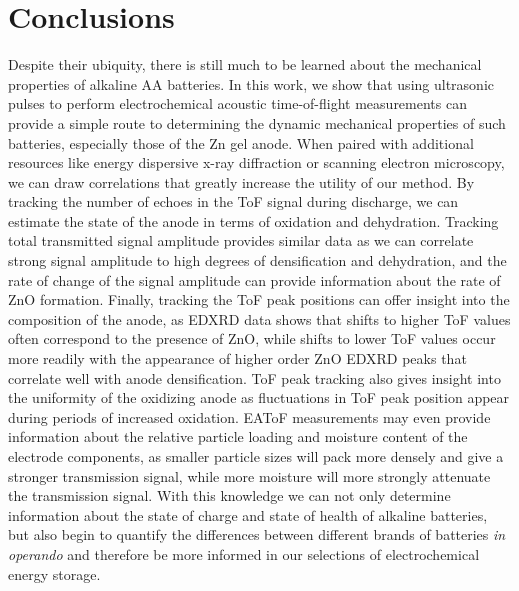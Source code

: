 \section{Conclusions}
\label{sec:alkbw:conclusion}

Despite their ubiquity, there is still much to be learned about the mechanical properties of alkaline AA batteries. In this work, we show that using ultrasonic pulses to perform electrochemical acoustic time-of-flight measurements can provide a simple route to determining the dynamic mechanical properties of such batteries, especially those of the Zn gel anode. When paired with additional resources like energy dispersive x-ray diffraction or scanning electron microscopy, we can draw correlations that greatly increase the utility of our method. By tracking the number of echoes in the ToF signal during discharge, we can estimate the state of the anode in terms of oxidation and dehydration. Tracking total transmitted signal amplitude provides similar data as we can correlate strong signal amplitude to high degrees of densification and dehydration, and the rate of change of the signal amplitude can provide information about the rate of ZnO formation. Finally, tracking the ToF peak positions can offer insight into the composition of the anode, as EDXRD data shows that shifts to higher ToF values often correspond to the presence of ZnO, while shifts to lower ToF values occur more readily with the appearance of higher order ZnO EDXRD peaks that correlate well with anode densification. ToF peak tracking also gives insight into the  uniformity of the oxidizing anode as fluctuations in ToF peak position appear during periods of increased oxidation. EAToF measurements may even provide information about the relative particle loading and moisture content of the electrode components, as smaller particle sizes will pack more densely and give a stronger transmission signal, while more moisture will more strongly attenuate the transmission signal. With this knowledge we can not only determine information about the state of charge and state of health of alkaline batteries, but also begin to quantify the differences between different brands of batteries \textit{in operando} and therefore be more informed in our selections of electrochemical energy storage.